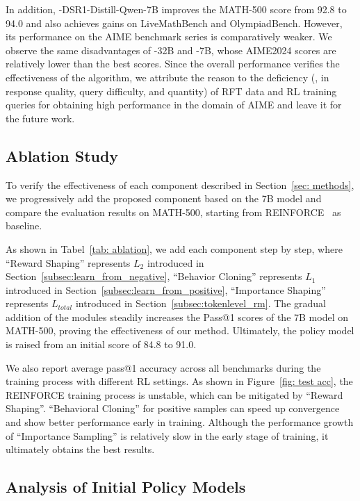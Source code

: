In addition, \methodname{}-DSR1-Distill-Qwen-7B improves the MATH-500 score from 92.8 to 94.0 and also achieves gains on LiveMathBench and OlympiadBench.
However, its performance on the AIME benchmark series is comparatively weaker. 
We observe the same disadvantages of \methodname{}-32B and \methodname{}-7B, whose AIME2024 scores are relatively lower than the best scores.
Since the overall performance verifies the effectiveness of the \methodname{} algorithm, we attribute the reason to the deficiency (\eg, in response quality, query difficulty, and quantity) of RFT data and RL training queries for obtaining high performance in the domain of AIME and leave it for the future work.


\subsection{Ablation Study}



To verify the effectiveness of each component described in Section~\ref{sec: methods}, we progressively add the proposed component based on the 7B model and compare the evaluation results on MATH-500, starting from REINFORCE~\cite{sutton1999policy} as baseline.

As shown in Tabel~\ref{tab: ablation}, we add each component step by step, where ``Reward Shaping'' represents $L_2$ introduced in Section~\ref{subsec:learn_from_negative}, ``Behavior Cloning'' represents $L_1$ introduced in Section~\ref{subsec:learn_from_positive}, ``Importance Shaping'' represents $L_{total}$ introduced in Section~\ref{subsec:tokenlevel_rm}.
The gradual addition of the modules steadily increases the Pass@1 scores of the 7B model on MATH-500, proving the effectiveness of our method.
Ultimately, the policy model is raised from an initial score of 84.8 to 91.0.

We also report average pass@1 accuracy across all benchmarks during the training process with different RL settings. 
As shown in Figure~\ref{fig: test acc}, the REINFORCE training process is unstable, which can be mitigated by ``Reward Shaping''.
``Behavioral Cloning'' for positive samples can speed up convergence and show better performance early in training.
Although the performance growth of ``Importance Sampling'' is relatively slow in the early stage of training, it ultimately obtains the best results.


\subsection{Analysis of Initial Policy Models}
\label{subsec: policy model analysis}

